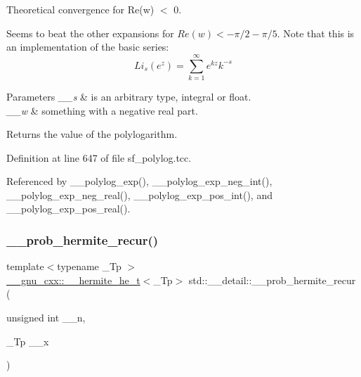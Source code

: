 Theoretical convergence for Re(w) $<$ 0.

Seems to beat the other expansions for $ Re(w) < -\pi/2 - \pi/5 $. Note that this is an implementation of the basic series\+: \[ Li_s(e^z) = \sum_{k=1}^{\infty} e^{kz} k^{-s} \]


\begin{DoxyParams}{Parameters}
{\em \+\_\+\+\_\+s} & is an arbitrary type, integral or float. \\
\hline
{\em \+\_\+\+\_\+w} & something with a negative real part. \\
\hline
\end{DoxyParams}
\begin{DoxyReturn}{Returns}
the value of the polylogarithm. 
\end{DoxyReturn}


Definition at line 647 of file sf\+\_\+polylog.\+tcc.



Referenced by \+\_\+\+\_\+polylog\+\_\+exp(), \+\_\+\+\_\+polylog\+\_\+exp\+\_\+neg\+\_\+int(), \+\_\+\+\_\+polylog\+\_\+exp\+\_\+neg\+\_\+real(), \+\_\+\+\_\+polylog\+\_\+exp\+\_\+pos\+\_\+int(), and \+\_\+\+\_\+polylog\+\_\+exp\+\_\+pos\+\_\+real().

\mbox{\label{namespacestd_1_1____detail_a15e668e86c18d01134aded2a1657b1b2}} 
\subsubsection{\texorpdfstring{\+\_\+\+\_\+prob\+\_\+hermite\+\_\+recur()}{\_\_prob\_hermite\_recur()}}
{\footnotesize\ttfamily template$<$typename \+\_\+\+Tp $>$ \\
\hyperlink{struct____gnu__cxx_1_1____hermite__he__t}{\+\_\+\+\_\+gnu\+\_\+cxx\+::\+\_\+\+\_\+hermite\+\_\+he\+\_\+t}$<$\+\_\+\+Tp$>$ std\+::\+\_\+\+\_\+detail\+::\+\_\+\+\_\+prob\+\_\+hermite\+\_\+recur (\begin{DoxyParamCaption}\item[{unsigned int}]{\+\_\+\+\_\+n,  }\item[{\+\_\+\+Tp}]{\+\_\+\+\_\+x }\end{DoxyParamCaption})}



